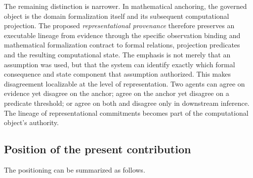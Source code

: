 \documentclass[11pt,a4paper]{article}
\begin{document}
The remaining distinction is narrower. In mathematical anchoring, the governed object is the domain formalization itself and its subsequent computational projection. The proposed \emph{representational provenance} therefore preserves an executable lineage from evidence through the specific observation binding and mathematical formalization contract to formal relations, projection predicates and the resulting computational state. The emphasis is not merely that an assumption was used, but that the system can identify exactly which formal consequence and state component that assumption authorized. This makes disagreement localizable at the level of representation. Two agents can agree on evidence yet disagree on the anchor; agree on the anchor yet disagree on a predicate threshold; or agree on both and disagree only in downstream inference. The lineage of representational commitments becomes part of the computational object's authority.

\subsection{Position of the present contribution}
The positioning can be summarized as follows.
\end{document}
